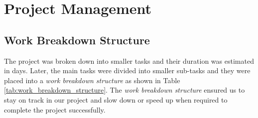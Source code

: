 \section{Project Management}
\subsection{Work Breakdown Structure}
The project was broken down into smaller tasks and their duration was estimated in days. Later, the main tasks were divided into smaller sub-tasks and they were placed into a \emph{work breakdown structure} as shown in Table \ref{tab:work_breakdown_structure}. The \emph{work breakdown structure} ensured us to stay on track in our project and slow down or speed up when required to complete the project successfully.

\begin{table}[ht]
    \scriptsize
    
    \renewcommand{\arraystretch}{1.125}
    
    
    \newcommand{\setCurrDate}[3]{\setdatenumber{#1}{#2}{#3}}
    
    \def\datedate{\thedatemonth/\thedateday/\thedateyear}
    
    \newcommand{\TEdate}[1]{
        \setdatebynumber{\thedatenumber}
        \multicolumn{1}{c}{#1} & 
        \datedate & 
        \addtocounter{datenumber}{#1} \setdatebynumber{\thedatenumber}
        \datedate
    }
    
    \setcounter{SubTableEntryID}{0}
    \setcounter{TableEntryID}{0}
    \newcommand\showTE{\setcounter{SubTableEntryID}{0}\stepcounter{TableEntryID}\theTableEntryID.\theSubTableEntryID \ }
    \newcommand\showSubTE{\stepcounter{SubTableEntryID}\theTableEntryID.\theSubTableEntryID \ }
    
    \newcommand{\tableEntry}[1]{\hline \multirow{2}{*}{\showTE #1}}
    \newcommand{\subTableEntry}[2]{& \showSubTE #1 & \TEdate{#2} \\ \cline{2-5}}
    \newcommand{\initialTableEntry}[2]{&0.1 #1 & \TEdate{#2} \\ \cline{2-5}}
    \newcommand{\finalTableEntry}[2]{\hline &\showTE #1 & \TEdate{#2} \\ \hline}


\end{table}
